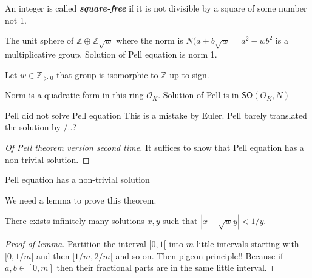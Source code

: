 \begin{defn}\leavevmode
	An integer is called \textit{\textbf{square-free}} if it is not divisible by a square of some number not 1.
\end{defn}

\begin{remark}\leavevmode
	The unit sphere of $\mathbb{Z}\oplus \mathbb{Z}\sqrt{w} $ where the norm is  $N(a+b\sqrt{w} =a^2-wb^2$ is a multiplicative group. Solution of Pell equation is norm 1.
\end{remark}

\begin{thm}\leavevmode
	Let $w\in\mathbb{Z}_{> 0}$ that group is isomorphic to $\mathbb{Z}$ {\color{3}up to sign}.
\end{thm}

 \begin{remark}\leavevmode
	 Norm is a quadratic form in this ring $\mathcal{O}_K$. Solution of Pell is in $\mathsf{SO}(O_K,N)$
\end{remark}

\begin{idea8}{Pell did not solve Pell equation}\leavevmode
	This is a mistake by Euler. Pell barely translated the solution by /..?
\end{idea8}

\begin{proof}[Of Pell theorem version second time]\leavevmode
	It suffices to show that Pell equation has a non trivial solution.
\end{proof}

\begin{thm}[Lagrange]\leavevmode
	 Pell equation has a non-trivial solution
\end{thm}
 We need a lemma to prove this theorem.

\begin{lemma}\leavevmode
	There exists infinitely many solutions $x,y$ such that  $|x-\sqrt{w} y|<1/y$.
\end{lemma}

\begin{proof}[Proof of lemma]\leavevmode
	Partition the interval $[0,1[$ into  $m$ little intervals starting with $[0,1/m[$ and then  $[1/m,2/m[$ and so on. Then pigeon principle!! Because if  $a,b\in [0,m]$ then their fractional parts are in the same little interval.
\end{proof}

